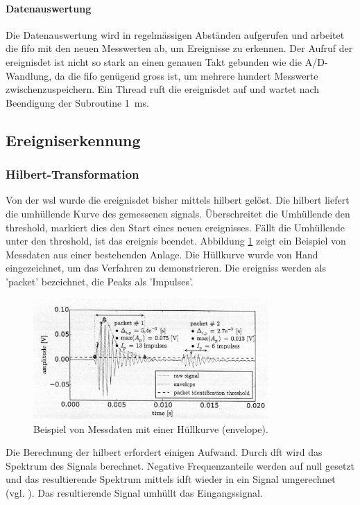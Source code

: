 \paragraph{Datenauswertung} Die Datenauswertung wird in regelmässigen Abständen aufgerufen und arbeitet die \gls{fifo} mit den neuen Messwerten ab, um Ereignisse zu erkennen. Der Aufruf der \gls{ereignisdet} ist nicht so stark an einen genauen Takt gebunden wie die A/D-Wandlung, da die \gls{fifo} genügend gross ist, um mehrere hundert Messwerte zwischenzuspeichern. Ein Thread ruft die \gls{ereignisdet} auf und wartet nach Beendigung der Subroutine 1~ms.

\subsection{Ereigniserkennung}\label{subsec.sw_ereignis}
\subsubsection{Hilbert-Transformation}
Von der \gls{wsl} wurde die \gls{ereignisdet} bisher mittels \gls{hilbert} gelöst. Die \gls{hilbert} liefert die umhüllende Kurve des gemessenen \gls{signal}s. Überschreitet die Umhüllende den \gls{threshold}, markiert dies den Start eines neuen \gls{ereignis}ses. Fällt die Umhüllende unter den \gls{threshold}, ist das \gls{ereignis} beendet. Abbildung \ref{fig.wslcurve} zeigt ein Beispiel von Messdaten aus einer bestehenden Anlage. Die Hüllkurve wurde von Hand eingezeichnet, um das Verfahren zu demonstrieren. Die \glspl{ereignis} werden als 'packet' bezeichnet, die Peaks als 'Impulses'.

\begin{figure}
	\centering
		\includegraphics[width=0.8\textwidth]{images/curve_wsl.png}
	\caption{Beispiel von Messdaten mit einer Hüllkurve (envelope).}
	\label{fig.wslcurve}
\end{figure}

Die Berechnung der \gls{hilbert} erfordert einigen Aufwand. Durch \gls{dft} wird das Spektrum des Signals berechnet. Negative Frequenzanteile werden auf null gesetzt und das resultierende Spektrum mittels \gls{idft} wieder in ein Signal umgerechnet (vgl. \cite{wiki_hilbert}). Das resultierende Signal umhüllt das Eingangssignal. 

